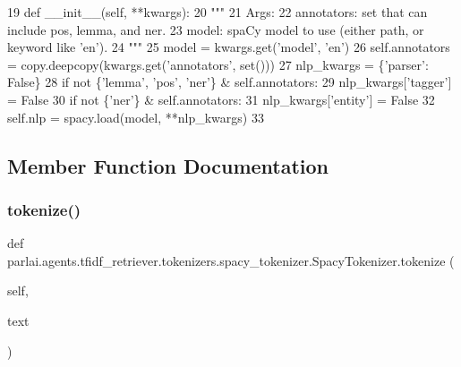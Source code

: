 \begin{DoxyCode}
19     \textcolor{keyword}{def }\_\_init\_\_(self, **kwargs):
20         \textcolor{stringliteral}{"""}
21 \textcolor{stringliteral}{        Args:}
22 \textcolor{stringliteral}{            annotators: set that can include pos, lemma, and ner.}
23 \textcolor{stringliteral}{            model: spaCy model to use (either path, or keyword like 'en').}
24 \textcolor{stringliteral}{        """}
25         model = kwargs.get(\textcolor{stringliteral}{'model'}, \textcolor{stringliteral}{'en'})
26         self.annotators = copy.deepcopy(kwargs.get(\textcolor{stringliteral}{'annotators'}, set()))
27         nlp\_kwargs = \{\textcolor{stringliteral}{'parser'}: \textcolor{keyword}{False}\}
28         \textcolor{keywordflow}{if} \textcolor{keywordflow}{not} \{\textcolor{stringliteral}{'lemma'}, \textcolor{stringliteral}{'pos'}, \textcolor{stringliteral}{'ner'}\} & self.annotators:
29             nlp\_kwargs[\textcolor{stringliteral}{'tagger'}] = \textcolor{keyword}{False}
30         \textcolor{keywordflow}{if} \textcolor{keywordflow}{not} \{\textcolor{stringliteral}{'ner'}\} & self.annotators:
31             nlp\_kwargs[\textcolor{stringliteral}{'entity'}] = \textcolor{keyword}{False}
32         self.nlp = spacy.load(model, **nlp\_kwargs)
33 
\end{DoxyCode}


\subsection{Member Function Documentation}
\mbox{\label{classparlai_1_1agents_1_1tfidf__retriever_1_1tokenizers_1_1spacy__tokenizer_1_1SpacyTokenizer_a479b83909bafee8db3f60c9d8fe69635}} 
\subsubsection{\texorpdfstring{tokenize()}{tokenize()}}
{\footnotesize\ttfamily def parlai.\+agents.\+tfidf\+\_\+retriever.\+tokenizers.\+spacy\+\_\+tokenizer.\+Spacy\+Tokenizer.\+tokenize (\begin{DoxyParamCaption}\item[{}]{self,  }\item[{}]{text }\end{DoxyParamCaption})}



